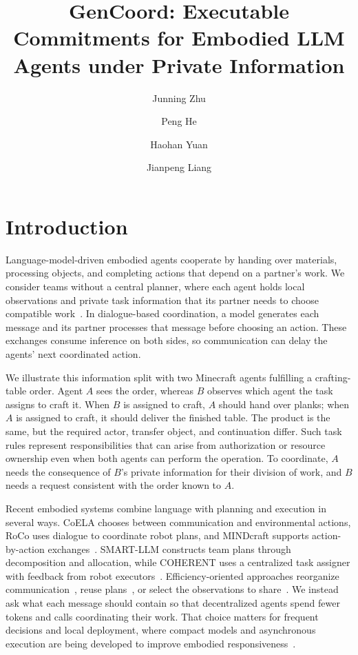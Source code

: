 \documentclass[sigconf,nonacm,balance=false]{aamas}
\title[GenCoord]{GenCoord: Executable Commitments for Embodied LLM Agents under Private Information}
\author{Junning Zhu}
\affiliation{%
  \institution{Beijing Normal-Hong Kong Baptist University}
  \city{Zhuhai}
  \country{China}}
\author{Peng He}
\affiliation{%
  \institution{Tsinghua University}
  \city{Beijing}
  \country{China}}
\author{Haohan Yuan}
\affiliation{%
  \institution{University of North Carolina at Charlotte}
  \city{Charlotte}
  \country{United States}}
\author{Jianpeng Liang}
\affiliation{%
  \institution{University of California San Diego}
  \city{San Diego}
  \country{United States}}
\begin{document}
\maketitle
\raggedbottom
{}

\section{Introduction}
Language-model-driven embodied agents cooperate by handing over materials, processing objects, and completing actions that depend on a partner's work. We consider teams without a central planner, where each agent holds local observations and private task information that its partner needs to choose compatible work~\cite{white2025collaborating,long2024teamcraft,zhang2024coela}. In dialogue-based coordination, a model generates each message and its partner processes that message before choosing an action. These exchanges consume inference on both sides, so communication can delay the agents' next coordinated action.

We illustrate this information split with two Minecraft agents fulfilling a crafting-table order. Agent $A$ sees the order, whereas $B$ observes which agent the task assigns to craft it. When $B$ is assigned to craft, $A$ should hand over planks; when $A$ is assigned to craft, it should deliver the finished table. The product is the same, but the required actor, transfer object, and continuation differ. Such task rules represent responsibilities that can arise from authorization or resource ownership even when both agents can perform the operation. To coordinate, $A$ needs the consequence of $B$'s private information for their division of work, and $B$ needs a request consistent with the order known to $A$.

Recent embodied systems combine language with planning and execution in several ways. CoELA chooses between communication and environmental actions, RoCo uses dialogue to coordinate robot plans, and MINDcraft supports action-by-action exchanges~\cite{zhang2024coela,mandi2024roco,white2025collaborating}. SMART-LLM constructs team plans through decomposition and allocation, while COHERENT uses a centralized task assigner with feedback from robot executors~\cite{kannan2023smart,liu2025coherent}. Efficiency-oriented approaches reorganize communication~\cite{chen2024scalable,guo2026organized}, reuse plans~\cite{aamas2026_QPUC1624}, or select the observations to share~\cite{aamas2026_WHRE3513}. We instead ask what each message should contain so that decentralized agents spend fewer tokens and calls coordinating their work. That choice matters for frequent decisions and local deployment, where compact models and asynchronous execution are being developed to improve embodied responsiveness~\cite{shukor2025smolvla}.
\end{document}
